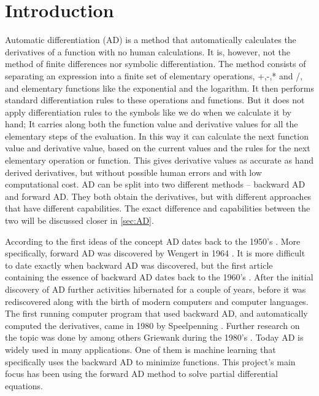 \chapter{Introduction}
Automatic differentiation (AD) is a method that automatically calculates the derivatives of a function with no human calculations. It is, however, not the method of finite differences nor symbolic differentiation. The method consists of separating an expression into a finite set of elementary operations, +,-,* and /, and elementary functions like the exponential and the logarithm. It then performs standard differentiation rules to these operations and functions. But it does not apply differentiation rules to the symbols like we do when we calculate it by hand; It carries along both the function value and derivative values for all the elementary steps of the evaluation. In this way it can calculate the next function value and derivative value, based on the current values and the rules for the next elementary operation or function. This gives derivative values as accurate as hand derived derivatives, but without possible human errors and with low computational cost. AD can be split into two different methods -- backward AD and forward AD. They both obtain the derivatives, but with different approaches that have different capabilities. The exact difference and capabilities between the two will be discussed closer in \autoref{sec:AD}. 

According to \emph{\cite{SurveyAD}} the first ideas of the concept AD dates back to the 1950's \emph{\citep{nolan1953analytical, beda1959programs}}. More specifically, forward AD was discovered by Wengert in 1964 \emph{\citep{wengert1964simple}}. It is more difficult to date exactly when backward AD was discovered, but the first article containing the essence of backward AD dates back to the 1960's \emph{\citep{boltyanskii1960theory}}. After the initial discovery of AD further activities hibernated for a couple of years, before it was rediscovered along with the birth of modern computers and computer languages. The first running computer program that used backward AD, and automatically computed the derivatives, came in 1980 by Speelpenning \emph{\citep{speelpenning1980compiling}}. Further research on the topic was done by among others Griewank during the 1980's \emph{\citep{griewank1989automatic}}. Today AD is widely used in many applications. One of them is machine learning that specifically uses the backward AD to minimize functions. This project's main focus has been using the forward AD method to solve partial differential equations. 

